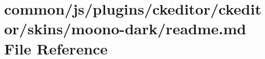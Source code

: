 \hypertarget{common_2js_2plugins_2ckeditor_2ckeditor_2skins_2moono-dark_2README_8md}{}\section{common/js/plugins/ckeditor/ckeditor/skins/moono-\/dark/readme.md File Reference}
\label{common_2js_2plugins_2ckeditor_2ckeditor_2skins_2moono-dark_2README_8md}
